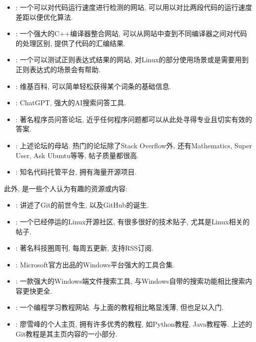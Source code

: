 \begin{itemize}
    \item {}: 一个可以对代码运行速度进行检测的网站, 可以用以对比两段代码的运行速度差距以便优化算法.
    \item {}: 一个强大的C++编译器整合网站, 可以从网站中查到不同编译器之间对代码的处理区别, 提供了代码的汇编结果.
    \item {}: 一个可以测试正则表达式结果的网站, 对Linux的部分使用场景或是需要用到正则表达式的场景会有帮助.
    \item {}: 维基百科, 可以简单轻松获得某个词条的基础信息.
    \item {}: ChatGPT, 强大的AI搜索问答工具.
    \item {}: 著名程序员问答论坛, 近乎任何程序问题都可以从此处寻得专业且切实有效的答案.
    \item {}: 上述论坛的母站. 热门的论坛除了Stack Overflow外, 还有Mathematics, Super User, Ask Ubuntu等等, 帖子质量都很高.
    \item {}: 知名代码托管平台, 拥有海量开源项目.
\end{itemize}
此外, 是一些个人认为有趣的资源或内容:
\begin{itemize}
    \item {}: 讲述了Git的前世今生, 以及GitHub的诞生.
    \item {}: 一个已经停运的Linux开源社区, 有很多很好的技术贴子, 尤其是Linux相关的帖子.
    \item {}: 著名科技圈周刊, 每周五更新, 支持RSS订阅.
    \item {}: Microsoft官方出品的Windows平台强大的工具合集.
    \item {}: 一款强大的Windows端文件搜索工具, 与Windows自带的搜索功能相比搜索内容更快更全.
    \item {}: 一个编程学习教程网站. 与上面的教程相比略显浅薄, 但也足以入门.
    \item {}: 廖雪峰的个人主页, 拥有许多优秀的教程, 如Python教程, Java教程等. 上述的Git教程是其主页内容的一小部分.
\end{itemize}

